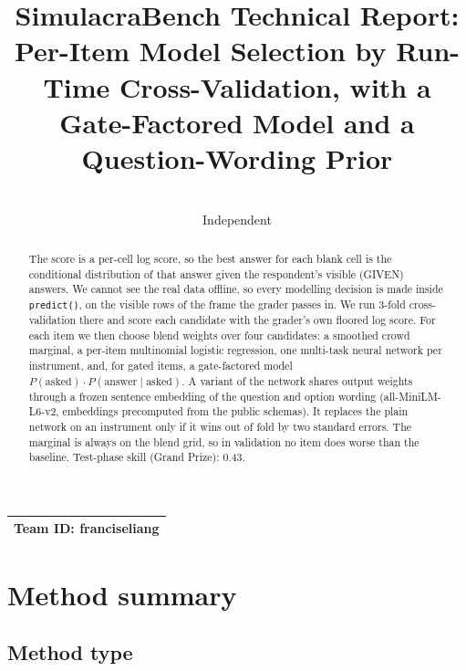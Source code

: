 \documentclass{article}
\title{SimulacraBench Technical Report:\\ Per-Item Model Selection by Run-Time Cross-Validation, with a Gate-Factored Model and a Question-Wording Prior}
\author{%
  \authorname\\
  Independent\\
  \texttt{\authoremail}
}
\newcommand{\teamid}{franciseliang}
\begin{document}
\maketitle

\begin{center}
\begin{tabular}{l}
\toprule
\textbf{Team ID:} \teamid \\
\bottomrule
\end{tabular}
\end{center}

\begin{abstract}
The score is a per-cell log score, so the best answer for each blank cell is the conditional distribution of that answer given the respondent's visible (GIVEN) answers. We cannot see the real data offline, so every modelling decision is made inside \texttt{predict()}, on the visible rows of the frame the grader passes in. We run 3-fold cross-validation there and score each candidate with the grader's own floored log score. For each item we then choose blend weights over four candidates: a smoothed crowd marginal, a per-item multinomial logistic regression, one multi-task neural network per instrument, and, for gated items, a gate-factored model $P(\text{asked})\cdot P(\text{answer}\mid\text{asked})$. A variant of the network shares output weights through a frozen sentence embedding of the question and option wording (all-MiniLM-L6-v2, embeddings precomputed from the public schemas). It replaces the plain network on an instrument only if it wins out of fold by two standard errors. The marginal is always on the blend grid, so in validation no item does worse than the baseline. Test-phase skill (Grand Prize): 0.43.
\end{abstract}

\section{Method summary}
\label{sec:method}

\subsection{Method type}
\end{document}

